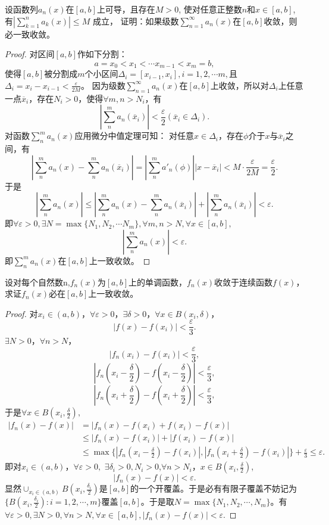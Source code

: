 \begin{exercise}
设函数列${a_n(x)}$在$[a,b]$上可导，且存在$M>0$,
使对任意正整数$n$和$x\in[a,b]$,
有$|\sum_{k=1}^na_k(x)|\leq M$ 成立，
证明：如果级数$\sum_{n=1}^{\infty}a_n(x)$在$[a,b]$收敛，则必一致收敛。%
  \end{exercise}  


  \begin{proof}
    对区间$[a,b]$作如下分割：
  $$a=x_0<x_1<\cdots x_{m-1}<x_m=b,$$
  使得$[a,b]$被分割成$m$个小区间$\Delta_i=[x_{i-1},x_i],i=1,2,\cdots m,$且$\Delta_i=x_i-x_{i-1}<\frac{\varepsilon}{2M}$。
  因为级数$\sum_{n=1}^{\infty}a_n(x)$在$[a,b]$上收敛，所以对$\Delta_i$上任意一点$\overline{x}_i$，存在$N_i>0$，使得$\forall m,n>N_i$，有$$|\sum_n^ma_n(\overline{x}_i)|<\frac{\varepsilon}{2}(\overline{x}_i\in\Delta_i).$$
  对函数$\sum_n^ma_n(x)$应用微分中值定理可知：
  对任意$x\in\Delta_i$，存在$\phi$介于$x$与$\overline{x}_i$之间，有$$|\sum_n^ma_n(x)-\sum_n^ma_n(\overline{x}_i)|=|\sum_n^ma'_n(\phi)||x-\overline{x}_i|<M\cdot\frac{\varepsilon}{2M}=\frac{\varepsilon}{2}.$$
  于是$$|\sum_n^ma_n(x)|\leq|\sum_n^ma_n(x)-\sum_n^ma_n(\overline{x}_i)|+|\sum_n^ma_n(\overline{x}_i)|<\varepsilon.$$
  即$\forall\varepsilon>0,\exists N=\max\{N_1,N_2,\cdots N_m\},\forall m,n>N,\forall x\in[a,b],$$$|\sum_n^ma_n(x)|<\varepsilon.$$
  即$\sum_n^ma_n(x)$在$[a,b]$上一致收敛。
  \end{proof}

  \begin{exercise}
  设对每个自然数n,$f_n(x)$为$[a,b]$上的单调函数，${f_n(x)}$收敛于连续函数$f(x)$，求证${f_n(x)}$必在$[a,b]$上一致收敛。
  \end{exercise}

  \begin{proof}
    对$x_i\in(a,b)$，$\forall\varepsilon>0$，$\exists\delta>0$，$\forall x\in B(x_i,\delta)$，
  $$|f(x)-f(x_i)|<\frac{\varepsilon}3.$$
  $\exists N>0$，$\forall n>N$，
  $$|f_n(x_i)-f(x_i)|<\frac{\varepsilon}{3},$$
  $$|f_n(x_i-\frac{\delta}{2})-f(x_i-\frac{\delta}{2})|<\frac{\varepsilon}{3},$$
  $$|f_n(x_i+\frac{\delta}{2})-f(x_i+\frac{\delta}{2})|<\frac{\varepsilon}{3},$$
  于是$\forall x\in B(x_i,\frac{\delta}{2}),$
  \begin{align*}
  |f_n(x)-f(x)|&=|f_n(x)-f(x_i)+f(x_i)-f(x)|\\
  &\leq|f_n(x)-f(x_i)|+|f(x_i)-f(x)|\\
  &\leq\max\{|f_n(x_i-\frac{\delta}{2})-f(x_i)|,|f_n(x_i+\frac{\delta}{2})-f(x_i)|\}+\frac{\varepsilon}{3}
  \leq\varepsilon.
  \end{align*}
  即对$x_i\in(a,b)$，$\forall\varepsilon>0,$ $\exists\delta_i>0,N_i>0$,$\forall n>N_i$，$x\in B(x_i,\frac{\delta}{2})$,
  $$|f_n(x)-f(x)|<\varepsilon.$$
  显然$\cup_{x_i\in(a,b)}B(x_i,\frac{\delta_i}{2})$是$[a,b]$的一个开覆盖。于是必有有限子覆盖不妨记为$\{B(x_i,\frac{\delta_i}{2}):i=1,2,\cdots,m\}$覆盖$[a,b]$。于是取$N=\max\{N_1,N_2,\cdots,N_m\}$。有$\forall\varepsilon>0,\exists N>0,\forall n>N,\forall x\in[a,b],|f_n(x)-f(x)|<\varepsilon.$    
  \end{proof}

